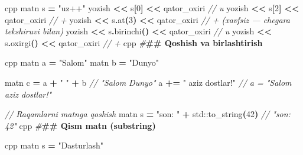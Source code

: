 \documentclass[a4paper,11pt,twoside,openright]{book}
\newenvironment{Shaded}{\begin{snugshade}}{\end{snugshade}}
\newcommand{\BuiltInTok}[1]{#1}
\newcommand{\CommentTok}[1]{\textcolor[rgb]{0.56,0.35,0.01}{\textit{#1}}}
\newcommand{\DecValTok}[1]{\textcolor[rgb]{0.00,0.00,0.81}{#1}}
\newcommand{\ErrorTok}[1]{\textcolor[rgb]{0.64,0.00,0.00}{\textbf{#1}}}
\newcommand{\NormalTok}[1]{#1}
\newcommand{\OperatorTok}[1]{\textcolor[rgb]{0.81,0.36,0.00}{\textbf{#1}}}
\newcommand{\PreprocessorTok}[1]{\textcolor[rgb]{0.56,0.35,0.01}{\textit{#1}}}
\newcommand{\StringTok}[1]{\textcolor[rgb]{0.31,0.60,0.02}{#1}}
\begin{document}
\begin{Shaded}
\begin{Highlighting}[]
\ErrorTok{\textasciigrave{}\textasciigrave{}\textasciigrave{}}\NormalTok{cpp}
\NormalTok{matn s }\OperatorTok{=} \StringTok{"uz++"}
\NormalTok{yozish }\OperatorTok{\textless{}\textless{}}\NormalTok{ s}\OperatorTok{[}\DecValTok{0}\OperatorTok{]} \OperatorTok{\textless{}\textless{}}\NormalTok{ qator\_oxiri      }\CommentTok{// \textquotesingle{}u\textquotesingle{}}
\NormalTok{yozish }\OperatorTok{\textless{}\textless{}}\NormalTok{ s}\OperatorTok{[}\DecValTok{2}\OperatorTok{]} \OperatorTok{\textless{}\textless{}}\NormalTok{ qator\_oxiri      }\CommentTok{// \textquotesingle{}+\textquotesingle{}}
\NormalTok{yozish }\OperatorTok{\textless{}\textless{}}\NormalTok{ s}\OperatorTok{.}\NormalTok{at}\OperatorTok{(}\DecValTok{3}\OperatorTok{)} \OperatorTok{\textless{}\textless{}}\NormalTok{ qator\_oxiri   }\CommentTok{// \textquotesingle{}+\textquotesingle{} (xavfsiz — chegara tekshiruvi bilan)}
\NormalTok{yozish }\OperatorTok{\textless{}\textless{}}\NormalTok{ s}\OperatorTok{.}\NormalTok{birinchi}\OperatorTok{()} \OperatorTok{\textless{}\textless{}}\NormalTok{ qator\_oxiri   }\CommentTok{// \textquotesingle{}u\textquotesingle{}}
\NormalTok{yozish }\OperatorTok{\textless{}\textless{}}\NormalTok{ s}\OperatorTok{.}\NormalTok{oxirgi}\OperatorTok{()} \OperatorTok{\textless{}\textless{}}\NormalTok{ qator\_oxiri     }\CommentTok{// \textquotesingle{}+\textquotesingle{}}
\ErrorTok{\textasciigrave{}\textasciigrave{}\textasciigrave{}}\NormalTok{cpp}
\PreprocessorTok{\#}\ErrorTok{\#\# Qo\textquotesingle{}shish va birlashtirish}

\ErrorTok{\textasciigrave{}\textasciigrave{}\textasciigrave{}}\NormalTok{cpp}
\NormalTok{matn a }\OperatorTok{=} \StringTok{"Salom"}
\NormalTok{matn b }\OperatorTok{=} \StringTok{"Dunyo"}

\NormalTok{matn c }\OperatorTok{=}\NormalTok{ a }\OperatorTok{+} \StringTok{" "} \OperatorTok{+}\NormalTok{ b             }\CommentTok{// "Salom Dunyo"}
\NormalTok{a }\OperatorTok{+=} \StringTok{" aziz do\textquotesingle{}stlar!"}           \CommentTok{// a = "Salom aziz do\textquotesingle{}stlar!"}

\CommentTok{// Raqamlarni matnga qo\textquotesingle{}shish}
\NormalTok{matn s }\OperatorTok{=} \StringTok{"son: "} \OperatorTok{+} \BuiltInTok{std::}\NormalTok{to\_string}\OperatorTok{(}\DecValTok{42}\OperatorTok{)}   \CommentTok{// "son: 42"}
\ErrorTok{\textasciigrave{}\textasciigrave{}\textasciigrave{}}\NormalTok{cpp}
\PreprocessorTok{\#}\ErrorTok{\#\# Qism matn (substring)}

\ErrorTok{\textasciigrave{}\textasciigrave{}\textasciigrave{}}\NormalTok{cpp}
\NormalTok{matn s }\OperatorTok{=} \StringTok{"Dasturlash"}


\end{Highlighting}
\end{Shaded}
\end{document}
